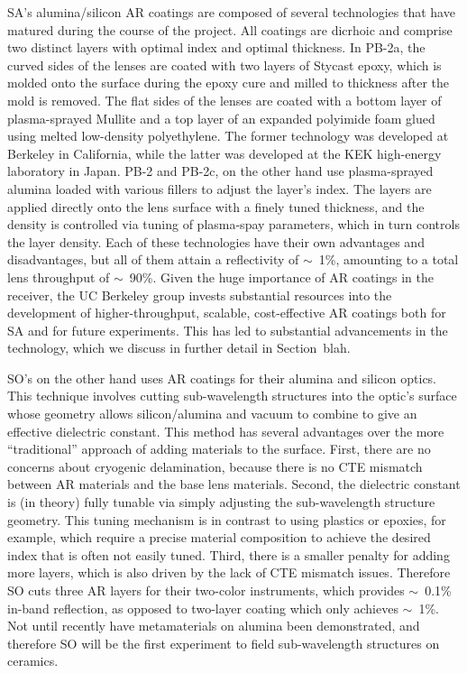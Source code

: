 SA's alumina/silicon AR coatings are composed of several technologies that have matured during the course of the project. All coatings are dicrhoic and comprise two distinct layers with optimal index and optimal thickness. In PB-2a, the curved sides of the lenses are coated with two layers of Stycast epoxy, which is molded onto the surface during the epoxy cure and milled to thickness after the mold is removed. The flat sides of the lenses are coated with a bottom layer of plasma-sprayed Mullite and a top layer of an expanded polyimide foam glued using melted low-density polyethylene. The former technology was developed at Berkeley in California, while the latter was developed at the KEK high-energy laboratory in Japan. PB-2 and PB-2c, on the other hand use plasma-sprayed alumina loaded with various fillers to adjust the layer's index. The layers are applied directly onto the lens surface with a finely tuned thickness, and the density is controlled via tuning of plasma-spay parameters, which in turn controls the layer density. Each of these technologies have their own advantages and disadvantages, but all of them attain a reflectivity of $\sim$~1\%, amounting to a total lens throughput of $\sim$~90\%. Given the huge importance of AR coatings in the receiver, the UC Berkeley group invests substantial resources into the development of higher-throughput, scalable, cost-effective AR coatings both for SA and for future experiments. This has led to substantial advancements in the technology, which we discuss in further detail in Section~blah.

SO's on the other hand uses  AR coatings for their alumina and silicon optics. This technique involves cutting sub-wavelength structures into the optic's surface whose geometry allows silicon/alumina and vacuum to combine to give an effective dielectric constant. This method has several advantages over the more ``traditional'' approach of adding materials to the surface. First, there are no concerns about cryogenic delamination, because there is no CTE mismatch between AR materials and the base lens materials. Second, the dielectric constant is (in theory) fully tunable via simply adjusting the sub-wavelength structure geometry. This tuning mechanism is in contrast to using plastics or epoxies, for example, which require a precise material composition to achieve the desired index that is often not easily tuned. Third, there is a smaller penalty for adding more layers, which is also driven by the lack of CTE mismatch issues. Therefore SO cuts three AR layers for their two-color instruments, which provides $\sim$~0.1\% in-band reflection, as opposed to two-layer coating which only achieves $\sim$~1\%. Not until recently have metamaterials on alumina been demonstrated, and therefore SO will be the first experiment to field sub-wavelength structures on ceramics.

